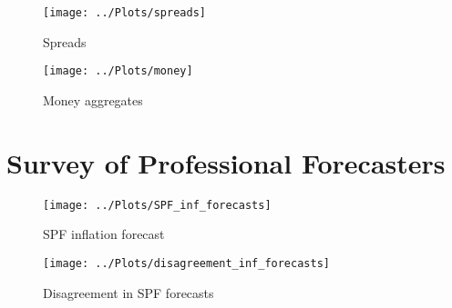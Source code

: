 \documentclass{beamer}
\begin{document}
\begin{frame}
\begin{figure}
	\centering
	\texttt{[image: ../Plots/spreads]}
	\caption{Spreads}
\end{figure}
\end{frame}


\begin{figure}
	\centering
	\texttt{[image: ../Plots/money]}
	\caption{Money aggregates}
\end{figure}


\section{Survey of Professional Forecasters}
\begin{frame}
\begin{figure}
	\centering
	\texttt{[image: ../Plots/SPF\_inf\_forecasts]}
	\caption{SPF inflation forecast}
\end{figure}
\end{frame}


\begin{frame}
\begin{figure}
	\centering
	\texttt{[image: ../Plots/disagreement\_inf\_forecasts]}
	\caption{Disagreement in SPF forecasts}
\end{figure}
\end{frame}
\end{document}

